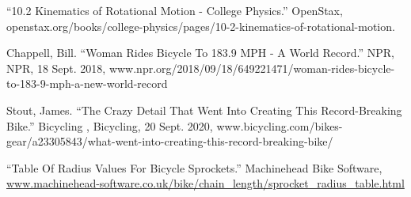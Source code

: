 \pagebreak

\noindent

\begin{thebibliography}{4}
“10.2 Kinematics of Rotational Motion - College Physics.” OpenStax,  
openstax.org/books/college-physics/pages/10-2-kinematics-of-rotational-motion.  

Chappell, Bill. “Woman Rides Bicycle To 183.9 MPH - A World Record.” NPR, NPR, 18 Sept.  2018,  
www.npr.org/2018/09/18/649221471/woman-rides-bicycle-to-183-9-mph-a-new-world-record

Stout, James. “The Crazy Detail That Went Into Creating This Record-Breaking Bike.” Bicycling , Bicycling, 20 Sept. 2020,  
www.bicycling.com/bikes-gear/a23305843/what-went-into-creating-this-record-breaking-bike/

“Table Of Radius Values For Bicycle Sprockets.” Machinehead Bike Software,  
\url{www.machinehead-software.co.uk/bike/chain_length/sprocket_radius_table.html}

\end{thebibliography}
